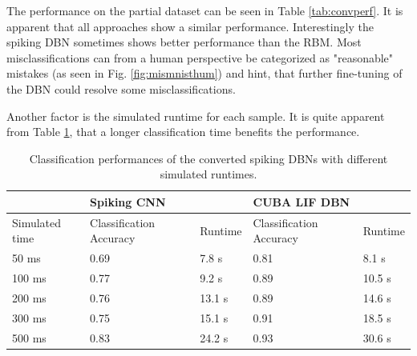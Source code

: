 
The performance on the partial dataset can be seen in Table \ref{tab:convperf}.
It is apparent that all approaches show a similar performance. Interestingly the spiking DBN sometimes shows better performance than the RBM.
Most misclassifications can from a human perspective be categorized as "reasonable" mistakes (as seen in Fig. \ref{fig:mismnisthum}) and hint, that further fine-tuning of the DBN could resolve some misclassifications.

Another factor is the simulated runtime for each sample. It is quite apparent from Table \ref{tab:pervovert}, that a longer classification time benefits the performance.


\begin{table}[]
\centering
\caption{Classification performances of the converted spiking DBNs with different simulated runtimes.}
\label{tab:pervovert}
\begin{tabularx}{\textwidth}{l|ll|ll}
\hline
	 				& \multicolumn{2}{l}{Spiking CNN}   & \multicolumn{2}{|l}{CUBA LIF DBN} \\ \hline
Simulated time		 				& Classification Accuracy    & Runtime & Classification Accuracy    & Runtime \\ \hline
50 ms    	& 0.69 & 7.8 s 		& 0.81 & 8.1 s               \\
100 ms     	& 0.77 & 9.2 s  	& 0.89 & 10.5 s              \\
200 ms    	& 0.76 & 13.1 s   & 0.89 & 14.6 s             \\
300 ms    	& 0.75 & 15.1 s   & 0.91 & 18.5 s             \\
500 ms     	& 0.83 & 24.2 s    & 0.93 & 30.6 s             \\\hline
\end{tabularx}
\end{table}

